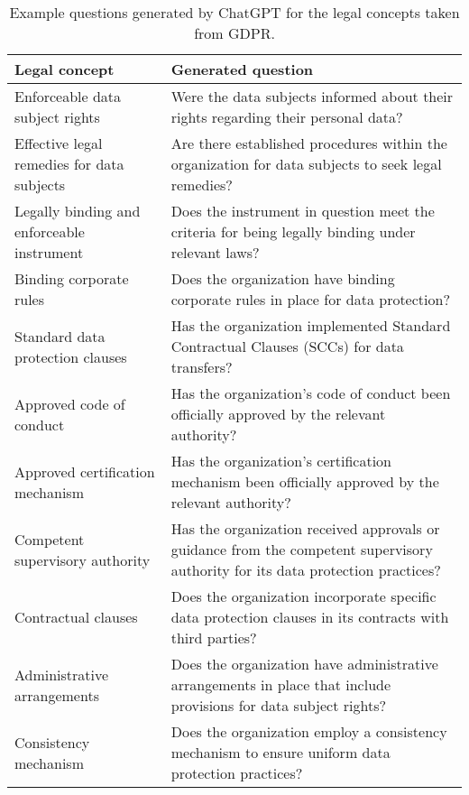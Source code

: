 \begin{table}[htbp]
  \centering\begin{tabular}{l p{6cm}}
    \hline
    \textbf{Legal concept} & \textbf{Generated question} \\
    \hline
Enforceable data subject rights & Were the data subjects informed about their rights regarding their personal data?\\
\hline
Effective legal remedies for data subjects & Are there established procedures within the organization for data subjects to seek legal remedies?\\
\hline
Legally binding and enforceable instrument & Does the instrument in question meet the criteria for being legally binding under relevant laws?\\
\hline
Binding corporate rules & Does the organization have binding corporate rules in place for data protection?\\
\hline
Standard data protection clauses & Has the organization implemented Standard Contractual Clauses (SCCs) for data transfers?\\
\hline
Approved code of conduct & Has the organization's code of conduct been officially approved by the relevant authority?\\
\hline
Approved certification mechanism & Has the organization's certification mechanism been officially approved by the relevant authority?\\
\hline
Competent supervisory authority & Has the organization received approvals or guidance from the competent supervisory authority for its data protection practices?\\
\hline
Contractual clauses & Does the organization incorporate specific data protection clauses in its contracts with third parties?\\
\hline
Administrative arrangements & Does the organization have administrative arrangements in place that include provisions for data subject rights?\\
\hline
Consistency mechanism & Does the organization employ a consistency mechanism to ensure uniform data protection practices?\\
\hline

  \end{tabular}
  \caption{Example questions generated by ChatGPT for the legal concepts taken from GDPR.}
  \label{tab:question-examples}
\end{table}

